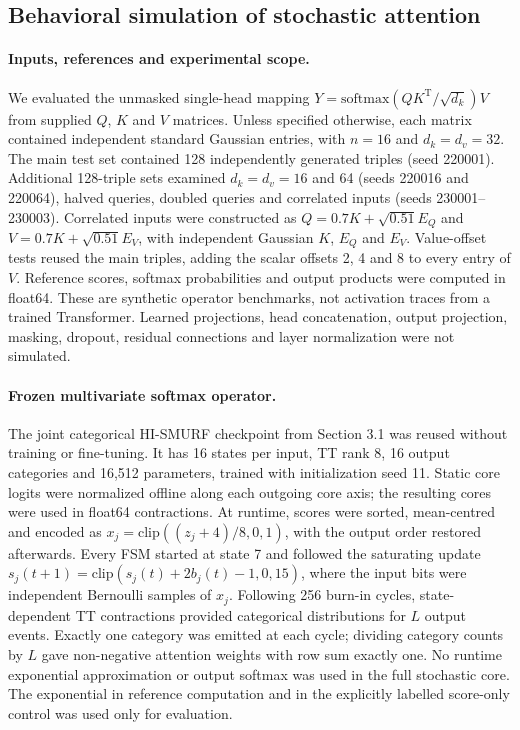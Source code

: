\subsection{Behavioral simulation of stochastic attention}
\label{methods:sc_attention}

\paragraph{Inputs, references and experimental scope.}
We evaluated the unmasked single-head mapping
$Y=\mathrm{softmax}(QK^{\mathrm T}/\sqrt{d_k})V$ from supplied $Q$, $K$ and
$V$ matrices. Unless specified otherwise, each matrix contained independent
standard Gaussian entries, with $n=16$ and $d_k=d_v=32$.
The main test set contained 128 independently generated triples (seed 220001).
Additional 128-triple sets examined $d_k=d_v=16$ and 64 (seeds 220016 and
220064), halved queries, doubled queries and correlated inputs (seeds
230001--230003). Correlated inputs were constructed as
$Q=0.7K+\sqrt{0.51}E_Q$ and $V=0.7K+\sqrt{0.51}E_V$, with independent
Gaussian $K$, $E_Q$ and $E_V$. Value-offset tests reused the main triples,
adding the scalar offsets 2, 4 and 8 to every entry of $V$.
Reference scores, softmax probabilities and output products were computed in
float64. These are synthetic operator benchmarks, not activation traces from
a trained Transformer. Learned projections, head concatenation, output
projection, masking, dropout, residual connections and layer normalization
were not simulated.

\paragraph{Frozen multivariate softmax operator.}
The joint categorical HI-SMURF checkpoint from Section 3.1 was reused without
training or fine-tuning. It has 16 states per input, TT rank 8, 16 output
categories and 16,512 parameters, trained with initialization seed 11.
Static core logits were normalized offline along each outgoing core axis;
the resulting cores were used in float64 contractions. At runtime, scores
were sorted, mean-centred and encoded as
$x_j=\mathrm{clip}((z_j+4)/8,0,1)$, with the output order restored afterwards.
Every FSM started at state 7 and followed the saturating update
$s_j(t+1)=\mathrm{clip}(s_j(t)+2b_j(t)-1,0,15)$, where the input bits were
independent Bernoulli samples of $x_j$. Following 256 burn-in cycles,
state-dependent TT contractions provided categorical distributions for $L$
output events. Exactly one category was emitted at each cycle; dividing
category counts by $L$ gave non-negative attention weights with row sum
exactly one. No runtime exponential approximation or output softmax was used
in the full stochastic core. The exponential in reference computation and
in the explicitly labelled score-only control was used only for evaluation.

